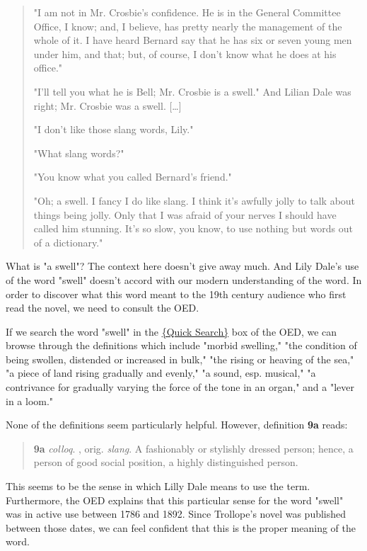 \documentclass[book]{memoir}
\begin{document}
\begin{quote} "I am not in Mr. Crosbie's confidence. He is in the General Committee Office, I know; and, I believe, has pretty nearly the management of the whole of it. I have heard Bernard say that he has six or seven young men under him, and that\textendash; but, of course, I don't know what he does at his office."

"I'll tell you what he is Bell; Mr. Crosbie is a swell." And Lilian Dale was right; Mr. Crosbie was a swell. [\dots]

 "I don't like those slang words, Lily."

"What slang words?"

"You know what you called Bernard's friend."

"Oh; a swell. I fancy I do like slang. I think it's awfully jolly to talk about things being jolly. Only that I was afraid of your nerves I should have called him stunning. It's so slow, you know, to use nothing but words out of a dictionary."
\end{quote}

What is "a swell"? The context here doesn't give away much. And Lily Dale's use of the word "swell" doesn't accord with our modern understanding of the word. In order to discover what this word meant to the 19th century audience who first read the novel, we need to consult the OED.

If we search the word "swell" in the \href{http://www.oed.com.ezproxy.bu.edu}{\{Quick Search\}} box of the OED, we can browse through the definitions which include "morbid swelling," "the condition of being swollen, distended or increased in bulk," "the rising or heaving of the sea," "a piece of land rising gradually and evenly," "a sound, esp. musical," "a contrivance for gradually varying the force of the tone in an organ," and a "lever in a loom."

None of the definitions seem particularly helpful. However, definition \textbf{9a} reads:

\begin{quote}\textbf{9a} \emph{colloq}. , orig. \emph{slang}. A fashionably or stylishly dressed person; hence, a person of good social position, a highly distinguished person. \end{quote}

This seems to be the sense in which Lilly Dale means to use the term. Furthermore, the OED explains that this particular sense for the word "swell" was in active use between 1786 and 1892. Since Trollope's novel was published between those dates, we can feel confident that this is the proper meaning of the word.
\end{document}
